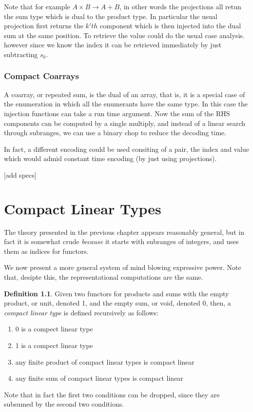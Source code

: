 \documentclass[oneside]{book}
\theoremstyle{plain}
\theoremstyle{definition}
\newtheorem{definition}{Definition}
\theoremstyle{plain}
\begin{document}
Note that for example $A \times B \rightarrow A + B$, in other words the
projections all retun the sum type which is dual to the product type.
In particular the usual projection first returns the $k'th$ component 
which is then injected into the dual sum at the same position.
To retrieve the value could do the usual case analysis. however
since we know the index it can be retrieved immediately by
just subtracting $s_k$.


\subsection{Compact Coarrays}
A coarray, or repeated sum, is the dual of an array, that is,
it is a special case of the enumeration in which all the
enumerants have the same type. In this case the injection
functions can take a run time argument.  Now the sum of the
RHS components can be computed by a single multiply, and
instead of a linear search through subranges, we can 
use a binary chop to reduce the decoding time.

In fact, a different encoding could be used consiting of
a pair, the index and value which would admid constant
time encoding (by just using projections).

[add specs]

\chapter{Compact Linear Types}
The theory presented in the previous chapter appears reasonably general,
but in fact it is somewhat crude {\em because} it starts with subranges
of integers, and uses them as indices for functors.

We now present a more general system of mind blowing expressive power.
Note that, desipte this, the representational computations are the same.

\begin{definition}
Given two functors for products and sums with the empty product, or unit,
denoted 1, and the empty sum, or void, denoted 0, then, a {\em compact
linear type} is defined recursively as follows:
\begin{enumerate}
\item 0 is a compect linear type
\item 1 is a compect linear type
\item any finite product of compact linear types is compact linear
\item any finite sum of compact linear types is compact linear
\end{enumerate}
Note that in fact the first two conditions can be dropped, since
they are subsumed by the second two conditions. 
\end{definition}
\end{document}
